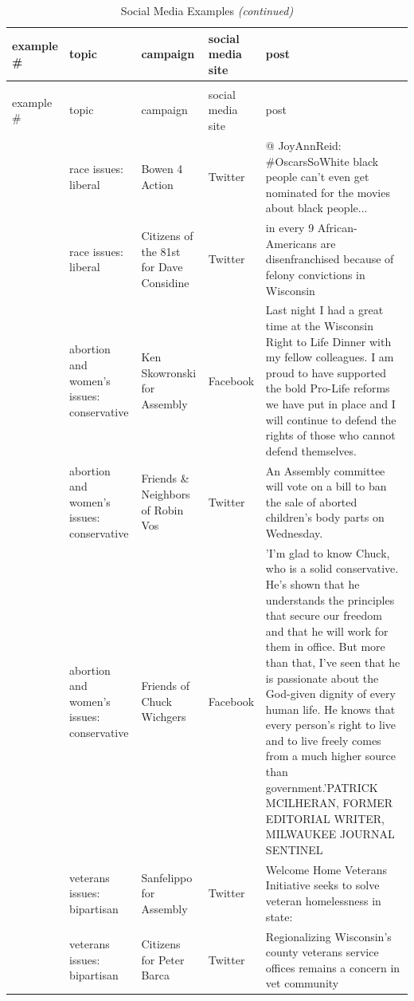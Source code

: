 \documentclass[12pt,]{article}
\begin{document}
\begin{longtable}[t]{>{\raggedright\arraybackslash}p{.65in}|>{\raggedright\arraybackslash}p{.6in}|>{\raggedright\arraybackslash}p{.7in}|>{\raggedright\arraybackslash}p{.6in}|>{\raggedright\arraybackslash}p{3in}}
\caption{\label{tab:unnamed-chunk-6}Social Media Examples}\\
\hline
example \# & topic & campaign & social media site & post\\
\hline
\endfirsthead
\caption[]{Social Media Examples \textit{(continued)}}\\
\hline
example \# & topic & campaign & social media site & post\\
\hline
\endhead
1 & race issues: liberal & Bowen 4 Action & Twitter & @ JoyAnnReid: \#OscarsSoWhite black people can't even get nominated for the movies about black people...\\
\hline
2 & race issues: liberal & Citizens of the 81st for Dave Considine & Twitter & 1 in every 9 African-Americans are disenfranchised because of felony convictions in Wisconsin\\
\hline
3 & abortion and women's issues: conservative & Ken Skowronski for Assembly & Facebook & Last night I had a great time at the Wisconsin Right to Life Dinner with my fellow colleagues. I am proud to have supported the bold Pro-Life reforms we have put in place and I will continue to defend the rights of those who cannot defend themselves.\\
\hline
4 & abortion and women's issues: conservative & Friends \& Neighbors of Robin Vos & Twitter & An Assembly committee will vote on a bill to ban the sale of aborted children's body parts on Wednesday.\\
\hline
5 & abortion and women's issues: conservative & Friends of Chuck Wichgers & Facebook & 'I'm glad to know Chuck, who is a solid conservative. He's shown that he understands the principles that secure our freedom and that he will work for them in office. But more than that, I've seen that he is passionate about the God-given dignity of every human life. He knows that every person's right to live and to live freely comes from a much higher source than government.'PATRICK MCILHERAN, FORMER EDITORIAL WRITER, MILWAUKEE JOURNAL SENTINEL\\
\hline
6 & veterans issues: bipartisan & Sanfelippo for Assembly & Twitter & Welcome Home Veterans Initiative seeks to solve veteran homelessness in state:\\
\hline
7 & veterans issues: bipartisan & Citizens for Peter Barca & Twitter & Regionalizing Wisconsin's county veterans service offices remains a concern in vet community\\

\end{longtable}
\end{document}
